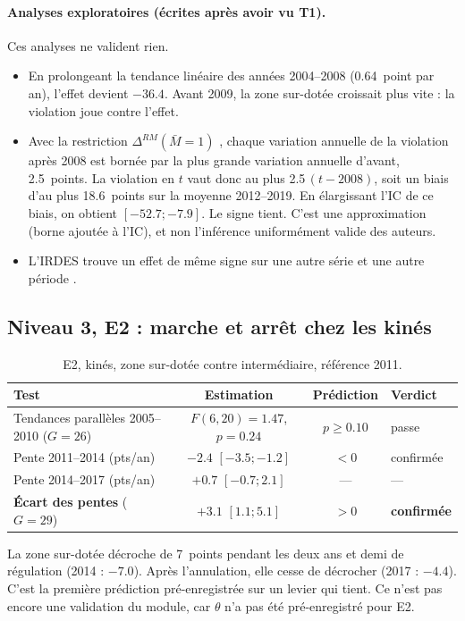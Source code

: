 \paragraph{Analyses exploratoires (écrites après avoir vu T1).} Ces analyses ne valident rien.
\begin{itemize}
  \item En prolongeant la tendance linéaire des années 2004--2008 (\num{+0.64}\mesure{}~point par
        an), l'effet devient $\num{-36.4}$\derive{}. Avant 2009, la zone sur-dotée croissait plus vite :
        la violation joue contre l'effet.
  \item Avec la restriction $\Delta^{RM}(\bar M = 1)$ \citep{a3-rambachan2023}, chaque variation
        annuelle de la violation après 2008 est bornée par la plus grande variation annuelle d'avant,
        \num{2.5}\mesure{}~points. La violation en $t$ vaut donc au plus \num{2.5}\,$(t-2008)$,
        soit un biais d'au plus \num{18.6}\derive{}~points sur la moyenne 2012--2019. En élargissant l'IC de ce biais, on obtient
        $[\num{-52.7} ; \num{-7.9}]$\derive{}. Le signe tient. C'est une approximation (borne
        ajoutée à l'IC), et non l'inférence uniformément valide des auteurs.
  \item L'IRDES trouve un effet de même signe sur une autre série et une autre période
        \citep{a3-irdes270}.
\end{itemize}

\subsection{Niveau 3, E2 : marche et arrêt chez les kinés}
\begin{table}[h]
\centering\small
\begin{tabular}{@{}lccl@{}}
\toprule
Test & Estimation & Prédiction & Verdict \\
\midrule
Tendances parallèles 2005--2010 ($G = 26$) & $F(6, 20) = \num{1.47}$\mesure{}, $p = \num{0.24}$\mesure{} & $p \ge \num{0.10}$ & passe \\
Pente 2011--2014 (pts/an) & $\num{-2.4}$\mesure{} $[\num{-3.5} ; \num{-1.2}]$ & $< 0$ & confirmée \\
Pente 2014--2017 (pts/an) & $+\num{0.7}$\mesure{} $[\num{-0.7} ; \num{2.1}]$ & --- & --- \\
\textbf{Écart des pentes} ($G = 29$) & $\mathbf{+\num{3.1}}$\mesure{} $[\num{1.1} ; \num{5.1}]$ & $> 0$ & \textbf{confirmée} \\
\bottomrule
\end{tabular}
\caption{E2, kinés, zone sur-dotée contre intermédiaire, référence 2011.}\label{a3-tab:e2}
\end{table}
La zone sur-dotée décroche de 7\mesure{}~points pendant les deux ans et demi de régulation (2014 :
$\num{-7.0}$\mesure{}). Après l'annulation, elle cesse de décrocher (2017 : $\num{-4.4}$\mesure{}).
C'est la première prédiction pré-enregistrée sur un levier qui tient. Ce n'est pas encore une
validation du module, car $\theta$ n'a pas été pré-enregistré pour E2.

